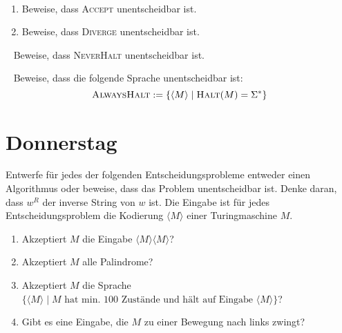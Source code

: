 \documentclass{uebung_cs}
\begin{document}
\begin{aufgabe}[Entscheidbarkeit I]\
	\begin{enumerate}
		\item Beweise, dass \textsc{Accept} unentscheidbar ist.
		\item Beweise, dass \textsc{Diverge} unentscheidbar ist.
	\end{enumerate}
\end{aufgabe}

\begin{aufgabe}[Entscheidbarkeit II]\
	Beweise, dass \textsc{NeverHalt} unentscheidbar ist.
\end{aufgabe}

\begin{aufgabe}\
	Beweise, dass die folgende Sprache unentscheidbar ist:
	$$\textsc{AlwaysHalt} := \{\langle M \rangle \;|\; \textsc{Halt}(M) = \Sigma^{\ast}\}$$
\end{aufgabe}

\section*{Donnerstag}

\begin{aufgabe}[Entscheidbarkeit IV]
	Entwerfe für jedes der folgenden Entscheidungsprobleme entweder einen Algorithmus oder beweise, dass das Problem unentscheidbar ist. Denke daran, dass $w^R$ der inverse String von $w$ ist. Die Eingabe ist für jedes Entscheidungsproblem die Kodierung $\langle M \rangle$ einer Turingmaschine $M$.
	\begin{enumerate}
		\item Akzeptiert $M$ die Eingabe $\langle M \rangle \langle M \rangle$?
		\item Akzeptiert $M$ alle Palindrome?
		\item Akzeptiert $M$ die Sprache $\{\langle M \rangle \;|\; M \text{ hat min. 100 Zustände und hält auf Eingabe } \langle M \rangle\}$?
		\item Gibt es eine Eingabe, die $M$ zu einer Bewegung nach links zwingt?
	\end{enumerate}
\end{aufgabe}
\end{document}
